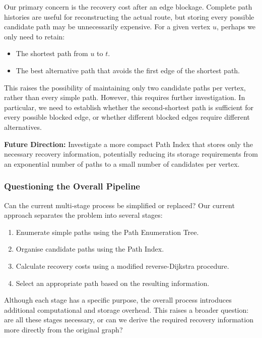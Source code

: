 \documentclass{article}
\begin{document}
Our primary concern is the recovery cost after an edge blockage. Complete path histories are useful for reconstructing the actual route, but storing every possible candidate path may be unnecessarily expensive. For a given vertex $u$, perhaps we only need to retain:

\begin{itemize}
    \item The shortest path from $u$ to $t$.
    \item The best alternative path that avoids the first edge of the shortest path.
\end{itemize}

This raises the possibility of maintaining only two candidate paths per vertex, rather than every simple path. However, this requires further investigation. In particular, we need to establish whether the second-shortest path is sufficient for every possible blocked edge, or whether different blocked edges require different alternatives.

\textbf{Future Direction:} Investigate a more compact Path Index that stores only the necessary recovery information, potentially reducing its storage requirements from an exponential number of paths to a small number of candidates per vertex.

\subsubsection{Questioning the Overall Pipeline}

Can the current multi-stage process be simplified or replaced? Our current approach separates the problem into several stages:

\begin{enumerate}
    \item Enumerate simple paths using the Path Enumeration Tree.
    \item Organise candidate paths using the Path Index.
    \item Calculate recovery costs using a modified reverse-Dijkstra procedure.
    \item Select an appropriate path based on the resulting information.
\end{enumerate}

Although each stage has a specific purpose, the overall process introduces additional computational and storage overhead. This raises a broader question: are all these stages necessary, or can we derive the required recovery information more directly from the original graph?
\end{document}
